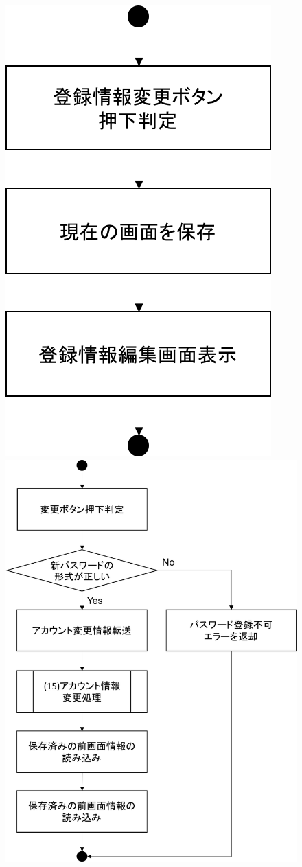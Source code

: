 \begin{figure}[htbp]
 \begin{minipage}{0.5\hsize}
  \begin{center}
   \includegraphics[width=0.5\linewidth,clip]{./img/flow/6.png}
  \end{center}
 \end{minipage}
 \begin{minipage}{0.5\hsize}
  \begin{center}
   \includegraphics[width=1\linewidth,clip]{./img/flow/7.png}

\end{center}
\end{minipage}
\end{figure}
